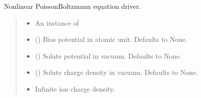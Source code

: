 \documentclass[letterpaper,10pt,english]{sphinxmanual}
\begin{document}
\begin{fulllineitems}
\begin{fulllineitems}
\label{\detokenize{fcdft.solvent:fcdft.solvent.pbe.PBE.make_phi}}
\pysigstartsignatures
\pysiglinewithargsret
{}
{\sphinxparamcomma {}\sphinxparamcomma {}}
{}
\pysigstopsignatures
\sphinxAtStartPar
Non\sphinxhyphen{}linear Poisson\sphinxhyphen{}Boltzmann equation driver.
\begin{quote}\begin{description}
\begin{itemize}
\item {} 
\sphinxAtStartPar
{} \textendash{} An instance of {\hyperref[\detokenize{fcdft.solvent:fcdft.solvent.pbe.PBE}]{}}

\item {} 
\sphinxAtStartPar
{} (\sphinxstyleliteralemphasis{\sphinxupquote{, }}) \textendash{} Bias potential in atomic unit. Defaults to None.

\item {} 
\sphinxAtStartPar
{} (\sphinxstyleliteralemphasis{\sphinxupquote{, }}) \textendash{} Solute potential in vacuum. Defaults to None.

\item {} 
\sphinxAtStartPar
{} (\sphinxstyleliteralemphasis{\sphinxupquote{, }}) \textendash{} Solute charge density in vacuum. Defaults to None.

\end{itemize}

\begin{itemize}
\item {} 
\sphinxAtStartPar
{} \textendash{} Infinite ion charge density.


\end{itemize}
\end{description}
\end{quote}
\end{fulllineitems}
\end{fulllineitems}
\end{document}
